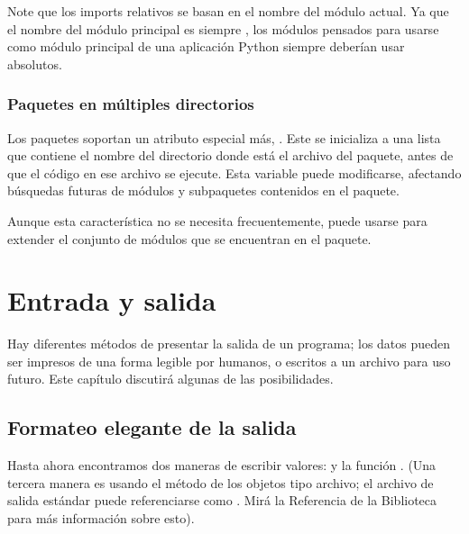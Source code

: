 \documentclass[a5paper,10pt,spanish]{sphinxmanual}
\begin{document}
\sphinxAtStartPar
Note que los imports relativos se basan en el nombre del módulo actual.  Ya que el nombre del módulo principal es siempre , los módulos pensados para usarse como módulo principal de una aplicación Python siempre deberían usar  absolutos.


\subsection{Paquetes en múltiples directorios}
\label{\detokenize{tutorial/modules:packages-in-multiple-directories}}
\sphinxAtStartPar
Los paquetes soportan un atributo especial más, .  Este se inicializa a una lista que contiene el nombre del directorio donde está el archivo  del paquete, antes de que el código en ese archivo se ejecute.  Esta variable puede modificarse, afectando búsquedas futuras de módulos y subpaquetes contenidos en el paquete.

\sphinxAtStartPar
Aunque esta característica no se necesita frecuentemente, puede usarse para extender el conjunto de módulos que se encuentran en el paquete.


\chapter{Entrada y salida}
\label{\detokenize{tutorial/inputoutput:input-and-output}}\label{\detokenize{tutorial/inputoutput:tut-io}}\label{\detokenize{tutorial/inputoutput::doc}}
\sphinxAtStartPar
Hay diferentes métodos de presentar la salida de un programa; los datos pueden ser impresos de una forma legible por humanos, o escritos a un archivo para uso futuro. Este capítulo discutirá algunas de las posibilidades.


\section{Formateo elegante de la salida}
\label{\detokenize{tutorial/inputoutput:fancier-output-formatting}}\label{\detokenize{tutorial/inputoutput:tut-formatting}}
\sphinxAtStartPar
Hasta ahora encontramos dos maneras de escribir valores:  y la función .  (Una tercera manera es usando el método  de los objetos tipo archivo; el archivo de salida estándar puede referenciarse como .  Mirá la Referencia de la Biblioteca para más información sobre esto).
\end{document}
